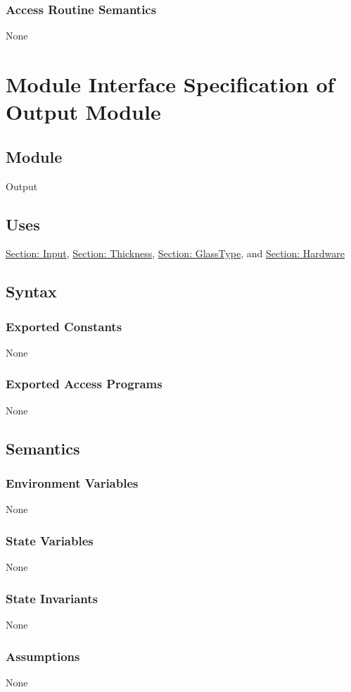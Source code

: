 \documentclass[12pt]{article}
\begin{document}
\subsubsection{Access Routine Semantics}
\label{Sec:AccRoutSemantics}
None
\section{Module Interface Specification of Output Module}
\label{Sec:Output}
\subsection{Module}
\label{Sec:Module}
Output
\subsection{Uses}
\label{Sec:Uses}
\hyperref[Sec:InputADT]{Section: Input}, \hyperref[Sec:ThicknessADT]{Section: Thickness}, \hyperref[Sec:GlassTypeADT]{Section: GlassType}, and \hyperref[Sec:HardwareADT]{Section: Hardware}
\subsection{Syntax}
\label{Sec:Syntax}
\subsubsection{Exported Constants}
\label{Sec:ExpConstants}
None
\subsubsection{Exported Access Programs}
\label{Sec:ExpAccPrograms}
None
\subsection{Semantics}
\label{Sec:Semantics}
\subsubsection{Environment Variables}
\label{Sec:EnviroVars}
None
\subsubsection{State Variables}
\label{Sec:StateVars}
None
\subsubsection{State Invariants}
\label{Sec:StateInvars}
None
\subsubsection{Assumptions}
\label{Sec:Assumps}
None
\end{document}
